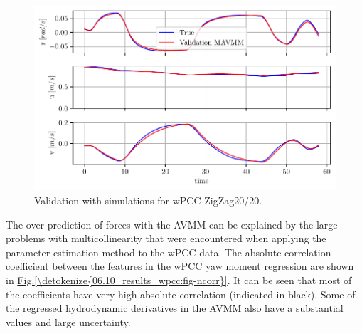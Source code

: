 \begin{figure}[!htb]
\centering
\includegraphics{kappa/images/8.pdf}
\caption{Validation with simulations for wPCC ZigZag20/20.}\label{\detokenize{06.10_results_wpcc:fig-validation-sim}}\end{figure}

\noindent The over-prediction of forces with the AVMM can be explained by the large problems with multicollinearity that were encountered when applying the parameter estimation method to the wPCC data. The absolute correlation coefficient between the features in the wPCC yaw moment regression are shown in \hyperref[\detokenize{06.10_results_wpcc:fig-ncorr}]{Fig.\@ \ref{\detokenize{06.10_results_wpcc:fig-ncorr}}}. It can be seen that most of the coefficients have very high absolute correlation (indicated in black). Some of the regressed hydrodynamic derivatives in the AVMM also have a substantial values and large uncertainty.


